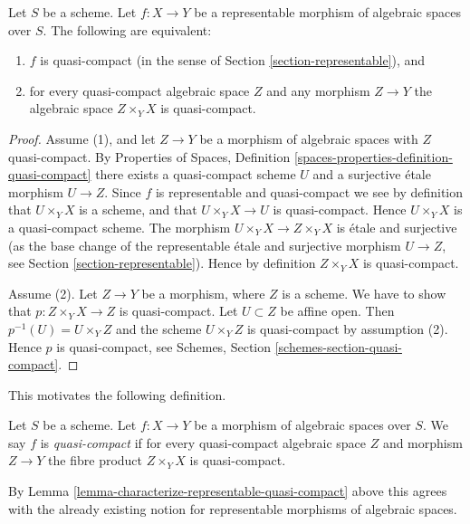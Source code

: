 \begin{lemma}
\label{lemma-characterize-representable-quasi-compact}
Let $S$ be a scheme.
Let $f : X \to Y$ be a representable morphism of algebraic spaces over $S$.
The following are equivalent:
\begin{enumerate}
\item $f$ is quasi-compact
(in the sense of Section \ref{section-representable}), and
\item for every quasi-compact algebraic space $Z$ and any morphism
$Z \to Y$ the algebraic space $Z \times_Y X$ is quasi-compact.
\end{enumerate}
\end{lemma}

\begin{proof}
Assume (1), and let $Z \to Y$ be a morphism of algebraic spaces with
$Z$ quasi-compact. By
Properties of Spaces,
Definition \ref{spaces-properties-definition-quasi-compact}
there exists a quasi-compact scheme $U$ and a surjective \'etale
morphism $U \to Z$. Since $f$ is representable and quasi-compact
we see by definition that $U \times_Y X$ is a scheme, and that
$U \times_Y X \to U$ is quasi-compact. Hence $U \times_Y X$ is
a quasi-compact scheme. The morphism $U \times_Y X \to Z \times_Y X$
is \'etale and surjective (as the base change of the representable
\'etale and surjective morphism $U \to Z$, see
Section \ref{section-representable}).
Hence by definition $Z \times_Y X$ is quasi-compact.

\medskip\noindent
Assume (2). Let $Z \to Y$ be a morphism, where $Z$ is a scheme.
We have to show that $p : Z \times_Y X \to Z$ is quasi-compact.
Let $U \subset Z$ be affine open. Then $p^{-1}(U) = U \times_Y Z$
and the scheme $U \times_Y Z$ is quasi-compact by assumption (2).
Hence $p$ is quasi-compact, see
Schemes, Section \ref{schemes-section-quasi-compact}.
\end{proof}

\noindent
This motivates the following definition.

\begin{definition}
\label{definition-quasi-compact}
Let $S$ be a scheme.
Let $f : X \to Y$ be a morphism of algebraic spaces over $S$.
We say $f$ is {\it quasi-compact} if for every quasi-compact
algebraic space $Z$ and morphism $Z \to Y$ the fibre product
$Z \times_Y X$ is quasi-compact.
\end{definition}

\noindent
By Lemma \ref{lemma-characterize-representable-quasi-compact}
above this agrees with the already existing notion
for representable morphisms of algebraic spaces.


